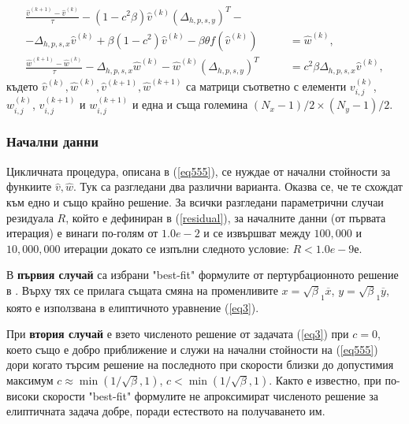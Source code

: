 \documentclass[a4paper]{article}
\newcommand{\rf}[1]{(\ref{#1})}
\theoremstyle{remark}
\begin{document}
\begin{large}
\begin{equation}\label{eq555}
\begin{split}
\frac {\widehat{v}^{(k+1)}-\widehat{v}^{(k)}}{\tau}- (1-c^2 \beta) \widehat{v}^{(k)}  (\Delta_{h,p,s,y})^T - \quad\quad\quad\;&\\
-\Delta_{h,p,s,x}  \widehat{v}^{(k)}+ \beta (1-c^2 ) \widehat{v}^{(k)} - \beta \theta f(\widehat{v}^{(k)}) &= \widehat{w}^{(k)}, \\
\frac  {\widehat{w}^{(k+1)} -\widehat{w}^{(k)}} {\tau} - \Delta_{h,p,s,x}  \widehat{w}^{(k)} - \widehat{w}^{(k)}  (\Delta_{h,p,s,y})^T &=  c^2 \beta \Delta_{h,p,s,x}  \widehat{v}^{(k)},
\end{split}
\end{equation}
където $\widehat{v}^{(k)}, \widehat{w}^{(k)}, \widehat{v}^{(k+1)}, \widehat{w}^{(k+1)}$ са матрици съответно с елементи ${v}_{i,j}^{(k)}$, ${w}_{i,j}^{(k)}$, ${v}_{i,j}^{(k+1)}$ и ${w}_{i,j}^{(k+1)}$ и една и съща големина $(N_x-1)/2 \times (N_y-1)/2$.
\subsubsection{Начални данни}
Цикличната процедура, описана в \rf{eq555}, се нуждае от начални стойности за функиите $\widehat{v},\widehat{w}$. Тук са разгледани два различни варианта. Оказва се, че те схождат към едно и също крайно решение. За всички разгледани параметрични случаи резидуала $R$, който е дефиниран в \rf{residual}, за началните данни (от първата итерация) е винаги по-голям от $1.0e-2$ и се извършват между $100,000$ и $10,000,000$ итерации докато се изпълни следното условие: $R<1.0e-9е$. 
 
В \textbf{първия случай} са избрани "best-fit" формулите от пертурбационното решение в \cite{ref15}. Върху тях се прилага същата смяна на променливите $x=\sqrt\beta_1 { \overline x}$, $y=\sqrt\beta_1 { \overline y}$, която е използвана в елиптичното уравнение \rf{eq3}. 

При \textbf{втория случай} е взето численото решение от задачата \rf{eq3} при $c=0$, което също е добро приближение и служи на начални стойности на \rf{eq555} дори когато търсим решение на последното при скорости близки до допустимия максимум $c \approx \min (1/ \sqrt{\beta},1)$, $c < \min (1/ \sqrt{\beta},1)$. Както е известно, при по-високи скорости "best-fit" формулите не апроксимират численото решение за елиптичната задача добре, поради естеството на получаването им.


\end{large}
\end{document}
